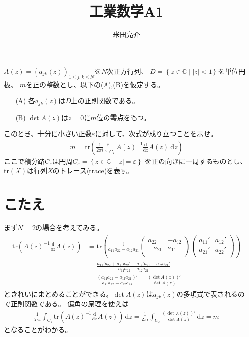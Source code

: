 \documentclass{jsarticle}
\def\diff{\textrm{d}}
\begin{document}
\title{工業数学A1}
\author{米田亮介}
\maketitle	

\section*{}
$A(z)=(a_{jk}(z))_{1\leq j,k\leq N}$を$N$次正方行列、
$D=\left\{z\in\mathbb{C}\mid |z|<1\right\}$を単位円板、
$m$を正の整数とし、以下の(A),(B)を仮定する。
\begin{enumerate}
\item[(A)] 各$a_{jk}(z)$は$D$上の正則関数である。
\item[(B)] $\det A(z)$は$z=0$に$m$位の零点をもつ。 
\end{enumerate}
このとき、十分に小さい正数$\varepsilon$に対して、次式が成り立つことを示せ。
\begin{align}
m=\mathrm{tr}\left(\frac{1}{2\pi i}\int_{C_{\varepsilon}}A(z)^{-1}\frac{\diff}{\diff z}A(z)~\diff z\right)
\end{align}
ここで積分路$C_{\varepsilon}$は円周$C_{\varepsilon}=\left\{z\in\mathbb{C}\mid |z|=\varepsilon\right\}$
を正の向きに一周するものとし、$\mathrm{tr}(X)$は行列$X$のトレース(trace)を表す。

\section*{こたえ}
まず$N=2$の場合を考えてみる。
\begin{align*}
\begin{aligned}
\mathrm{tr}\left(A(z)^{-1}\frac{\diff}{\diff z}A(z)\right)
&=\mathrm{tr}\left(\frac{1}{a_{11}a_{22}-a_{12}a_{21}}
\begin{pmatrix}
    a_{22} & -a_{12} \\
    -a_{21} & a_{11} \\
\end{pmatrix}
\begin{pmatrix}
    a_{11}' & a_{12}' \\
    a_{21}' & a_{22}' \\
\end{pmatrix}
\right)\\
&=\frac{a_{11}'a_{22}+a_{11}a_{22}'-a_{12}'a_{21}-a_{12}a_{21}'}{a_{11}a_{22}-a_{12}a_{21}}\\
&=\frac{\left(a_{11}a_{22}-a_{12}a_{21}\right)'}{a_{11}a_{22}-a_{12}a_{21}}
=\frac{\left(\det A(z)\right)'}{\det A(z)}
\end{aligned}
\end{align*}
ときれいにまとめることができる。$\det A(z)$は$a_{jk}(z)$の多項式で表されるので正則関数である。
偏角の原理を使えば
\begin{align}
\frac{1}{2\pi i}\int_{C_{\varepsilon}}\mathrm{tr}\left(A(z)^{-1}\frac{\diff}{\diff z}A(z)\right)~\diff z=\frac{1}{2\pi i}\int_{C_{\varepsilon}}\frac{\left(\det A(z)\right)'}{\det A(z)}~\diff z=m
\end{align}
となることがわかる。
\end{document}
